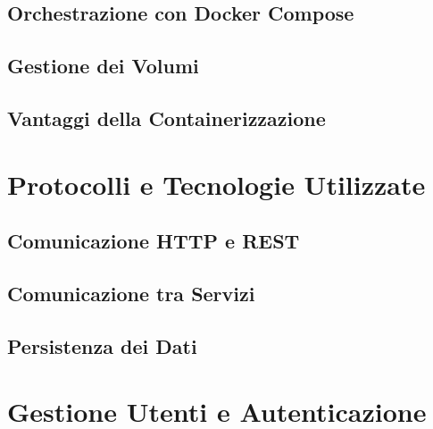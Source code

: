\documentclass[12pt,a4paper]{report}
\begin{document}
\section{Orchestrazione con Docker Compose}

\section{Gestione dei Volumi}

\section{Vantaggi della Containerizzazione}

\chapter{Protocolli e Tecnologie Utilizzate}
\label{cap:protocolli}

\section{Comunicazione HTTP e REST}

\section{Comunicazione tra Servizi}

\section{Persistenza dei Dati}

\chapter{Gestione Utenti e Autenticazione}
\label{cap:autenticazione}
\end{document}
